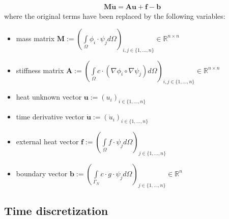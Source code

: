 \documentclass{IOS-Book-Article}
\theoremstyle{plain}
\theoremstyle{definition}
\begin{document}
\begin{align}
	\mathbf M \mathbf{\dot u} = \mathbf A \mathbf{u} + \mathbf f - \mathbf b
	\label{eqn:heq_fem_matrix_form}
\end{align}
where the original terms have been replaced by the following variables:
\begin{itemize}
\item mass matrix $\mathbf M := \left( \int \limits_{\Omega} \phi_i \cdot \psi_j d\Omega \right)_{i, j \in \{1, \dots , n\}} \in \mathbb{R}^{n \times n}$
\item stiffness matrix $\mathbf A := \left( \int \limits_{\Omega} c \cdot (\nabla \phi_i \circ \nabla \psi_j) d\Omega \right)_{i, j \in \{1, \dots , n\}} \in \mathbb{R}^{n \times n}$
\item heat unknown vector $\mathbf u := (u_i)_{i \in \{1, \dots , n\}}$
\item time derivative vector $\mathbf{\dot u} := (\dot u_i)_{i \in \{1, \dots , n\}}$
\item external heat vector $\mathbf f := \left( \int \limits_{\Omega} f \cdot \psi_j d\Omega \right)_{j \in \{1, \dots , n\}}$
\item boundary vector $\mathbf b := \left( \int \limits_{\Gamma_N} c \cdot g \cdot \psi_j d\Omega \right)_{j \in \{1, \dots , n\}} \in \mathbb{R}^n$
\end{itemize}

\subsection{Time discretization}
\end{document}
